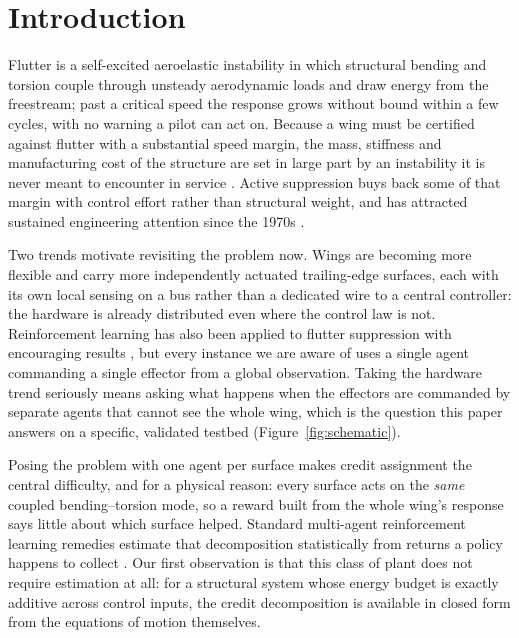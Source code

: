 \documentclass[preprint,11pt]{elsarticle}
\begin{document}
\section{Introduction}
\label{sec:intro}

Flutter is a self-excited aeroelastic instability in which structural
bending and torsion couple through unsteady aerodynamic loads and draw
energy from the freestream; past a critical speed the response grows
without bound within a few cycles, with no warning a pilot can act on.
Because a wing must be certified against flutter with a substantial speed
margin, the mass, stiffness and manufacturing cost of the structure are set
in large part by an instability it is never meant to encounter in service
\cite{livne2018flutter, mukhopadhyay2003historical}. Active suppression buys
back some of that margin with control effort rather than structural weight,
and has attracted sustained engineering attention since the 1970s
\cite{karpel1982design,waszak2001robust,block1998applied}.

Two trends motivate revisiting the problem now. Wings are becoming more
flexible and carry more independently actuated trailing-edge surfaces, each
with its own local sensing on a bus rather than a dedicated wire to a
central controller: the hardware is already distributed even where the
control law is not. Reinforcement learning has also been applied to flutter
suppression with encouraging results
\cite{circulation2023,stallflutter2025,flyingwing2022}, but every instance
we are aware of uses a single agent commanding a single effector from a
global observation. Taking the hardware trend seriously means asking what
happens when the effectors are commanded by separate agents that cannot see
the whole wing, which is the question this paper answers on a specific,
validated testbed (Figure~\ref{fig:schematic}).

Posing the problem with one agent per surface makes credit assignment the
central difficulty, and for a physical reason: every surface acts on the
\emph{same} coupled bending--torsion mode, so a reward built from the whole
wing's response says little about which surface helped. Standard
multi-agent reinforcement learning remedies estimate that decomposition
statistically from returns a policy happens to collect
\cite{sunehag2018vdn,rashid2018qmix,foerster2018coma}. Our first observation
is that this class of plant does not require estimation at all: for a
structural system whose energy budget is exactly additive across control
inputs, the credit decomposition is available in closed form from the
equations of motion themselves.
\end{document}
